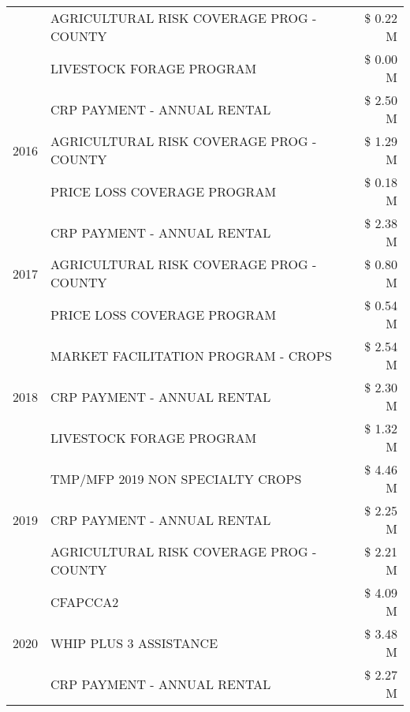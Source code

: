 \begin{tabular}{llr}
 & AGRICULTURAL RISK COVERAGE PROG - COUNTY & \$ 0.22 M \\
 & LIVESTOCK FORAGE PROGRAM & \$ 0.00 M \\
\cline{1-3}
\multirow[t]{3}{*}{2016} & CRP PAYMENT - ANNUAL RENTAL & \$ 2.50 M \\
 & AGRICULTURAL RISK COVERAGE PROG - COUNTY & \$ 1.29 M \\
 & PRICE LOSS COVERAGE PROGRAM & \$ 0.18 M \\
\cline{1-3}
\multirow[t]{3}{*}{2017} & CRP PAYMENT - ANNUAL RENTAL & \$ 2.38 M \\
 & AGRICULTURAL RISK COVERAGE PROG - COUNTY & \$ 0.80 M \\
 & PRICE LOSS COVERAGE PROGRAM & \$ 0.54 M \\
\cline{1-3}
\multirow[t]{3}{*}{2018} & MARKET FACILITATION PROGRAM - CROPS & \$ 2.54 M \\
 & CRP PAYMENT - ANNUAL RENTAL & \$ 2.30 M \\
 & LIVESTOCK FORAGE PROGRAM & \$ 1.32 M \\
\cline{1-3}
\multirow[t]{3}{*}{2019} & TMP/MFP 2019 NON SPECIALTY CROPS & \$ 4.46 M \\
 & CRP PAYMENT - ANNUAL RENTAL & \$ 2.25 M \\
 & AGRICULTURAL RISK COVERAGE PROG - COUNTY & \$ 2.21 M \\
\cline{1-3}
\multirow[t]{3}{*}{2020} & CFAPCCA2 & \$ 4.09 M \\
 & WHIP PLUS 3 ASSISTANCE & \$ 3.48 M \\
 & CRP PAYMENT - ANNUAL RENTAL & \$ 2.27 M \\
\cline{1-3}
\bottomrule
\end{tabular}
